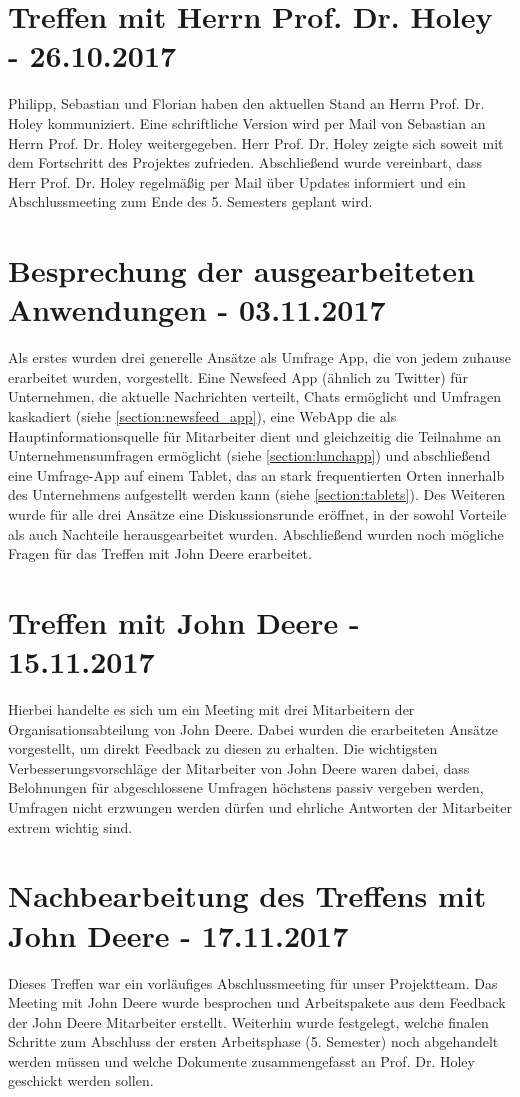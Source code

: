 \section{Treffen mit Herrn Prof. Dr. Holey - 26.10.2017}
Philipp, Sebastian und Florian haben den aktuellen Stand an Herrn Prof. Dr. Holey kommuniziert. Eine schriftliche Version wird per Mail von Sebastian an Herrn Prof. Dr. Holey weitergegeben. Herr Prof. Dr. Holey zeigte sich soweit mit dem Fortschritt des Projektes zufrieden. Abschließend wurde vereinbart, dass Herr Prof. Dr. Holey regelmäßig per Mail über Updates informiert und ein Abschlussmeeting zum Ende des 5. Semesters geplant wird.

\section{Besprechung der ausgearbeiteten Anwendungen - 03.11.2017}
Als erstes wurden drei generelle Ansätze als Umfrage App, die von jedem zuhause erarbeitet wurden, vorgestellt. Eine Newsfeed App (ähnlich zu Twitter) für Unternehmen, die aktuelle Nachrichten verteilt, Chats ermöglicht und Umfragen kaskadiert (siehe \vref{section:newsfeed_app}), eine WebApp die als Hauptinformationsquelle für Mitarbeiter dient und gleichzeitig die Teilnahme an Unternehmensumfragen ermöglicht (siehe \vref{section:lunchapp}) und abschließend eine Umfrage-App auf einem Tablet, das an stark frequentierten Orten innerhalb des Unternehmens aufgestellt werden kann (siehe \vref{section:tablets}). Des Weiteren wurde für alle drei Ansätze eine Diskussionsrunde eröffnet, in der sowohl Vorteile als auch Nachteile herausgearbeitet wurden. Abschließend wurden noch mögliche Fragen für das Treffen mit John Deere erarbeitet.

\section{Treffen mit John Deere - 15.11.2017}
Hierbei handelte es sich um ein Meeting mit drei Mitarbeitern der Organisationsabteilung von John Deere. Dabei wurden die erarbeiteten Ansätze vorgestellt, um direkt Feedback zu diesen zu erhalten. Die wichtigsten Verbesserungsvorschläge der Mitarbeiter von John Deere waren dabei, dass Belohnungen für abgeschlossene Umfragen höchstens passiv vergeben werden, Umfragen nicht erzwungen werden dürfen und ehrliche Antworten der Mitarbeiter extrem wichtig sind.

\section{Nachbearbeitung des Treffens mit John Deere - 17.11.2017}
Dieses Treffen war ein vorläufiges Abschlussmeeting für unser Projektteam. Das Meeting mit John Deere wurde besprochen und Arbeitspakete aus dem Feedback der John Deere Mitarbeiter erstellt. Weiterhin wurde festgelegt, welche finalen Schritte zum Abschluss der ersten Arbeitsphase (5. Semester) noch abgehandelt werden müssen und welche Dokumente zusammengefasst an Prof. Dr. Holey geschickt werden sollen.

